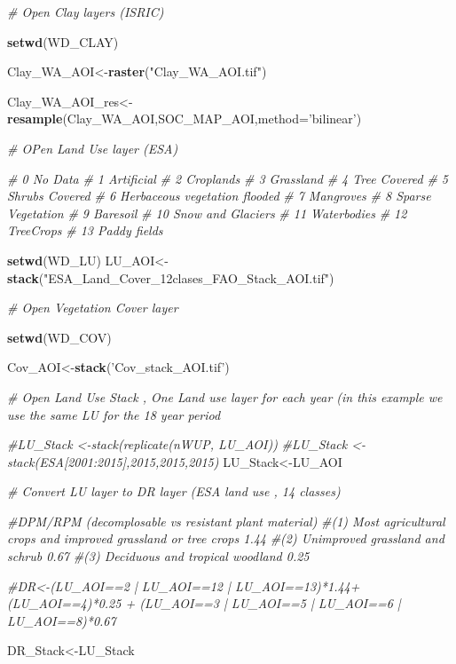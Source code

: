\documentclass[
  10pt,
  b5paper,
]{book}
\newenvironment{Shaded}{\begin{snugshade}}{\end{snugshade}}
\newcommand{\CommentTok}[1]{\textcolor[rgb]{0.56,0.35,0.01}{\textit{#1}}}
\newcommand{\DataTypeTok}[1]{\textcolor[rgb]{0.13,0.29,0.53}{#1}}
\newcommand{\KeywordTok}[1]{\textcolor[rgb]{0.13,0.29,0.53}{\textbf{#1}}}
\newcommand{\NormalTok}[1]{#1}
\newcommand{\StringTok}[1]{\textcolor[rgb]{0.31,0.60,0.02}{#1}}
\begin{document}
\begin{Shaded}
\begin{Highlighting}[]
\CommentTok{# Open Clay layers  (ISRIC)}

\KeywordTok{setwd}\NormalTok{(WD_CLAY)}

\NormalTok{Clay_WA_AOI<-}\KeywordTok{raster}\NormalTok{(}\StringTok{"Clay_WA_AOI.tif"}\NormalTok{)}

\NormalTok{Clay_WA_AOI_res<-}\KeywordTok{resample}\NormalTok{(Clay_WA_AOI,SOC_MAP_AOI,}\DataTypeTok{method=}\StringTok{'bilinear'}\NormalTok{) }

\CommentTok{# OPen Land Use layer (ESA)}

\CommentTok{# 0	No Data}
\CommentTok{# 1 Artificial}
\CommentTok{# 2 Croplands}
\CommentTok{# 3 Grassland}
\CommentTok{# 4 Tree Covered}
\CommentTok{# 5 Shrubs Covered}
\CommentTok{# 6 Herbaceous vegetation flooded}
\CommentTok{# 7 Mangroves}
\CommentTok{# 8 Sparse Vegetation}
\CommentTok{# 9 Baresoil}
\CommentTok{# 10 Snow and Glaciers}
\CommentTok{# 11 Waterbodies}
\CommentTok{# 12 TreeCrops}
\CommentTok{# 13 Paddy fields}


\KeywordTok{setwd}\NormalTok{(WD_LU)}
\NormalTok{LU_AOI<-}\KeywordTok{stack}\NormalTok{(}\StringTok{"ESA_Land_Cover_12clases_FAO_Stack_AOI.tif"}\NormalTok{)}

\CommentTok{# Open Vegetation Cover layer }

\KeywordTok{setwd}\NormalTok{(WD_COV)}

\NormalTok{Cov_AOI<-}\KeywordTok{stack}\NormalTok{(}\StringTok{'Cov_stack_AOI.tif'}\NormalTok{)}

\CommentTok{# Open Land Use Stack , One Land use layer for each year (in this example we use the same LU for the 18 year period}

\CommentTok{#LU_Stack <-stack(replicate(nWUP, LU_AOI))}
\CommentTok{#LU_Stack <-stack(ESA[2001:2015],2015,2015,2015)}
\NormalTok{LU_Stack<-LU_AOI}

\CommentTok{# Convert LU layer  to DR layer (ESA land use , 14 classes)}

\CommentTok{#DPM/RPM (decomplosable vs resistant plant material)}
\CommentTok{#(1) Most agricultural crops and improved grassland or tree crops 1.44 }
\CommentTok{#(2) Unimproved grassland and schrub 0.67}
\CommentTok{#(3) Deciduous and tropical woodland 0.25    }

\CommentTok{#DR<-(LU_AOI==2 | LU_AOI==12 | LU_AOI==13)*1.44+ (LU_AOI==4)*0.25 + (LU_AOI==3 | LU_AOI==5 | LU_AOI==6 | LU_AOI==8)*0.67}

\NormalTok{DR_Stack<-LU_Stack}


\end{Highlighting}
\end{Shaded}
\end{document}
